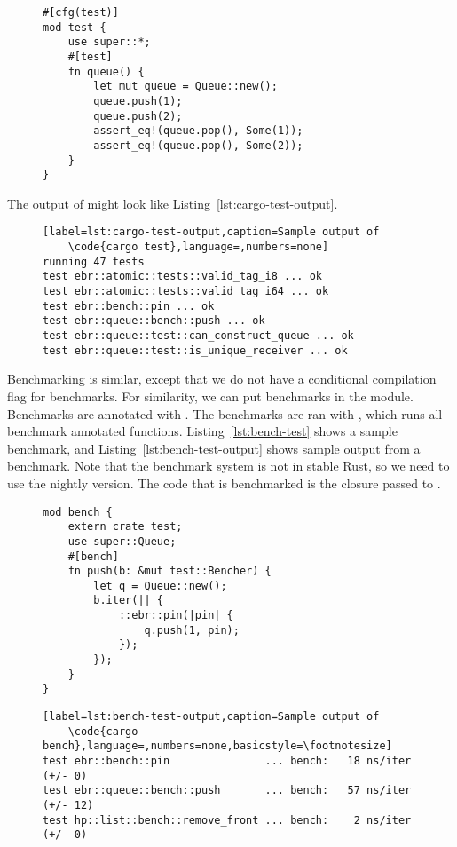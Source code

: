 \documentclass[b5paper]{report}
\begin{document}
\begin{appendices}
  \begin{figure}[ht!]
  \begin{lstlisting}[label=lst:cargo-test,caption=An example test in Rust]
#[cfg(test)]
mod test {
    use super::*;
    #[test]
    fn queue() {
        let mut queue = Queue::new();
        queue.push(1);
        queue.push(2);
        assert_eq!(queue.pop(), Some(1));
        assert_eq!(queue.pop(), Some(2));
    }
}
    \end{lstlisting}
  \end{figure}
  The output of  might look like
  Listing~\ref{lst:cargo-test-output}.
  \begin{figure}[ht!]
    \begin{lstlisting}[label=lst:cargo-test-output,caption=Sample output of
    \code{cargo test},language=,numbers=none]
running 47 tests
test ebr::atomic::tests::valid_tag_i8 ... ok
test ebr::atomic::tests::valid_tag_i64 ... ok
test ebr::bench::pin ... ok
test ebr::queue::bench::push ... ok
test ebr::queue::test::can_construct_queue ... ok
test ebr::queue::test::is_unique_receiver ... ok
    \end{lstlisting}
  \end{figure}

  Benchmarking is similar, except that we do not have a conditional compilation
  flag for benchmarks. For similarity, we can put benchmarks in the 
  module. Benchmarks are annotated with \code{\#[bench]}. The benchmarks are ran
  with , which runs all benchmark annotated functions.
  Listing~\ref{lst:bench-test} shows a sample benchmark, and
  Listing~\ref{lst:bench-test-output} shows sample output from a benchmark.
  Note that the benchmark system is not in stable Rust, so we need to use the
  nightly version. The code that is benchmarked is the closure passed to
  .
  \begin{figure}[ht!]
  \begin{lstlisting}[label=lst:bench-test,caption=An example benchmark in Rust]
mod bench {
    extern crate test;
    use super::Queue;
    #[bench]
    fn push(b: &mut test::Bencher) {
        let q = Queue::new();
        b.iter(|| {
            ::ebr::pin(|pin| {
                q.push(1, pin);
            });
        });
    }
}
    \end{lstlisting}
  \end{figure}
  \begin{figure}[ht!]
    \begin{lstlisting}[label=lst:bench-test-output,caption=Sample output of
    \code{cargo bench},language=,numbers=none,basicstyle=\footnotesize]
test ebr::bench::pin               ... bench:   18 ns/iter (+/- 0)
test ebr::queue::bench::push       ... bench:   57 ns/iter (+/- 12)
test hp::list::bench::remove_front ... bench:    2 ns/iter (+/- 0)
    \end{lstlisting}
  \end{figure}






\end{appendices}
\end{document}
